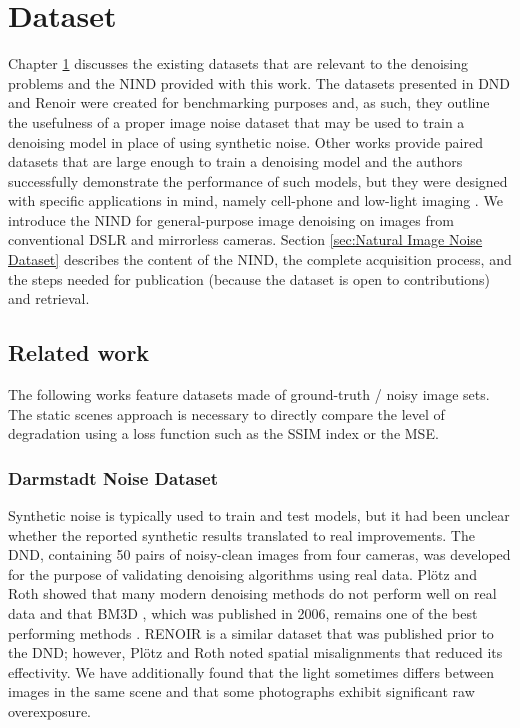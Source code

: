 \chapter{Dataset}\label{chap:Dataset}


Chapter \ref{chap:Dataset} discusses the existing datasets that are relevant to the denoising problems and the \acl{NIND} provided with this work. The datasets presented in \acf{DND} and Renoir \cite{renoir} were created for benchmarking purposes and, as such, they outline the usefulness of a proper image noise dataset that may be used to train a denoising model in place of using synthetic noise. Other works provide paired datasets that are large enough to train a denoising model and the authors successfully demonstrate the performance of such models, but they were designed with specific applications in mind, namely cell-phone \cite{sidd} and low-light imaging \cite{learningtoseeinthedark}. We introduce the \acl{NIND} for general-purpose image denoising on images from conventional \ac{DSLR} and mirrorless cameras. Section \ref{sec:Natural Image Noise Dataset} describes the content of the \ac{NIND}, the complete acquisition process, and the steps needed for publication (because the dataset is open to contributions) and retrieval.

\section{Related work}
The following works feature datasets made of ground-truth / noisy image sets. The static scenes approach is necessary to directly compare the level of degradation using a loss function such as the \ac{SSIM} index or the \ac{MSE}. 
\subsection{Darmstadt Noise Dataset}
Synthetic noise is typically used to train and test models, but it had been unclear whether the reported synthetic results translated to real improvements. The \acl{DND}, containing 50 pairs of noisy-clean images from four cameras, was developed for the purpose of validating denoising algorithms using real data. Plötz and Roth showed that many modern denoising methods do not perform well on real data and that \ac{BM3D} \cite{bm3d}, which was published in 2006, remains one of the best performing methods \cite{darmstadt}. RENOIR \cite{renoir} is a similar dataset that was published prior to the \acs{DND}; however, Plötz and Roth noted spatial misalignments that reduced its effectivity. We have additionally found that the light sometimes differs between images in the same scene and that some photographs exhibit significant raw overexposure.
